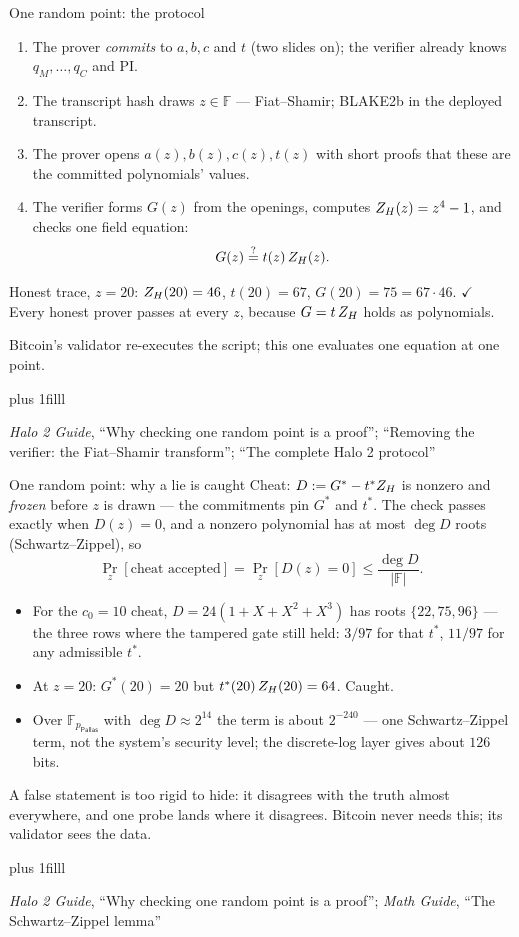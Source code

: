 \documentclass[aspectratio=169,11pt]{beamer}
\newcommand{\F}{\mathbb{F}}
\newcommand{\Pallas}{\ensuremath{\mathsf{Pallas}}}
\newcommand{\Fpp}{\ensuremath{\F_{p_{\Pallas}}}}
\newcommand{\src}[1]{\par\vskip0pt plus 1filll
  {\fontsize{6}{7.2}\selectfont\color{arbdim}\raggedright #1\par}}
\begin{document}
\begin{frame}{One random point: the protocol}
\begin{enumerate}
  \item The prover \emph{commits} to $a, b, c$ and $t$ (two slides on);
    the verifier already knows $q_M, \dots, q_C$ and $\mathrm{PI}$.
  \item The transcript hash draws $z \in \F$ --- Fiat--Shamir; BLAKE2b
    in the deployed transcript.
  \item The prover opens $a(z), b(z), c(z), t(z)$ with short proofs that
    these are the committed polynomials' values.
  \item The verifier forms $G(z)$ from the openings, computes
    $Z_H(z) = z^4 - 1$, and checks one field equation:
    \[
    G(z) \overset{?}{=} t(z)\, Z_H(z) .
    \]
\end{enumerate}
Honest trace, $z = 20$: $Z_H(20) = 46$, $t(20) = 67$,
$G(20) = 75 = 67 \cdot 46$. \(\checkmark\) Every honest prover passes at
every $z$, because $G = t\,Z_H$ holds as polynomials.

\medskip
Bitcoin's validator re-executes the script; this one evaluates one
equation at one point.
\src{\emph{Halo 2 Guide}, ``Why checking one random point is a proof'';
``Removing the verifier: the Fiat--Shamir transform''; ``The complete
Halo 2 protocol''}
\end{frame}

\begin{frame}{One random point: why a lie is caught}
Cheat: $D := G^{*} - t^{*} Z_H$ is nonzero and \emph{frozen} before
$z$ is drawn --- the commitments pin $G^{*}$ and $t^{*}$. The check
passes exactly when $D(z) = 0$, and a nonzero polynomial has at most
$\deg D$ roots (Schwartz--Zippel), so
\[
\Pr_{z}[\text{cheat accepted}] = \Pr_z[D(z) = 0]
\le \frac{\deg D}{|\F|} .
\]
\begin{itemize}
  \item For the $c_0 = 10$ cheat, $D = 24(1 + X + X^2 + X^3)$ has roots
    $\{22, 75, 96\}$ --- the three rows where the tampered gate still
    held: $3/97$ for that $t^{*}$, $11/97$ for any admissible $t^{*}$.
  \item At $z = 20$: $G^{*}(20) = 20$ but $t^{*}(20)\,Z_H(20) = 64$.
    Caught.
  \item Over $\Fpp$ with $\deg D \approx 2^{14}$ the term is about
    $2^{-240}$ --- one Schwartz--Zippel term, not the system's security
    level; the discrete-log layer gives about $126$ bits.
\end{itemize}
A false statement is too rigid to hide: it disagrees with the truth
almost everywhere, and one probe lands where it disagrees. Bitcoin never
needs this; its validator sees the data.
\src{\emph{Halo 2 Guide}, ``Why checking one random point is a proof'';
\emph{Math Guide}, ``The Schwartz--Zippel lemma''}
\end{frame}
\end{document}
